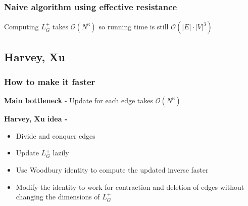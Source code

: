 \documentclass{beamer}
\newcommand{\laplacian}[1][G]{\ensuremath{L_{#1}^{+}}}
\begin{document}
\begin{frame}
\frametitle{Naive algorithm using effective resistance}

\begin{figure}
\end{figure}

Computing $ L_G^+ $ takes $\mathcal{O}(N^3)$ so running time is still $\mathcal{O}(|E| \cdot |V|^3) $

\end{frame}

\subsection{Harvey, Xu}

\begin{frame}
 
 \frametitle{How to make it faster}
 
 \textbf{Main bottleneck} - Update for each edge takes $\mathcal{O}(N^3)$
 
  \leavevmode\hphantom{ }
   \leavevmode\hphantom{ }
 
 \pause
 \large\textbf{Harvey, Xu \cite{harvey2016generating} idea  - }
 
 \begin{itemize}
 \pause
  \item Divide and conquer edges
 \pause
 \item Update $\laplacian$ lazily
 \pause
 \item Use Woodbury identity to compute the updated inverse faster 
\pause
\item Modify the identity to work for contraction and deletion of edges without changing the dimensions of $\laplacian$
 \end{itemize}

\end{frame}
\end{document}
